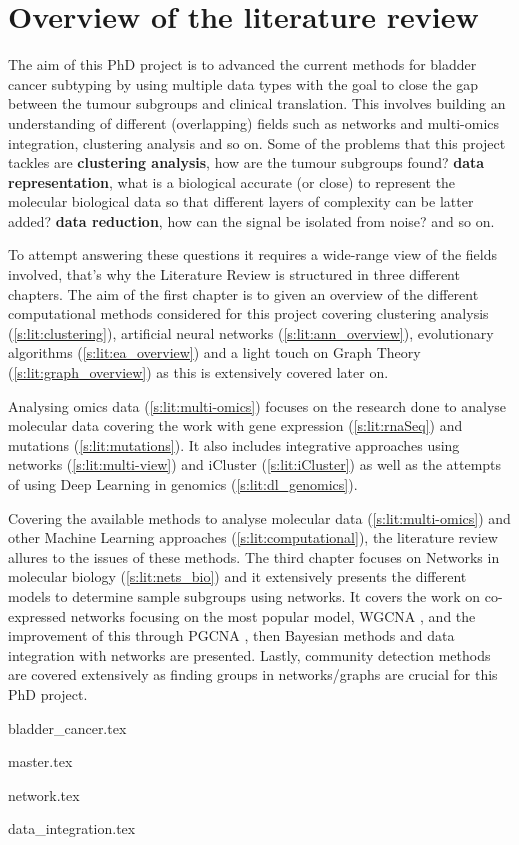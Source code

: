 

\section{Overview of the literature review}


The aim of this PhD project is to advanced the current methods for bladder cancer subtyping by using multiple data types with the goal to close the gap between the tumour subgroups and clinical translation. This involves building an understanding of different (overlapping) fields such as networks and multi-omics integration, clustering analysis and so on. Some of the problems that this project tackles are \textbf{clustering analysis}, how are the tumour subgroups found? \textbf{data representation}, what is a biological accurate (or close) to represent the molecular biological data so that different layers of complexity can be latter added? \textbf{data reduction}, how can the signal be isolated from noise? and so on.

To attempt answering these questions it requires a wide-range view of the fields involved, that's why the Literature Review is structured in three different chapters. The aim of the first chapter is to given an overview of the different computational methods considered for this project covering clustering analysis (\ref{s:lit:clustering}), artificial neural networks (\ref{s:lit:ann_overview}), evolutionary algorithms (\ref{s:lit:ea_overview}) and a light touch on Graph Theory (\ref{s:lit:graph_overview}) as this is extensively covered later on.

Analysing omics data (\ref{s:lit:multi-omics}) focuses on the research done to analyse molecular data covering the work with gene expression (\ref{s:lit:rnaSeq}) and mutations (\ref{s:lit:mutations}). It also includes integrative approaches using networks (\ref{s:lit:multi-view}) and iCluster (\ref{s:lit:iCluster}) as well as the attempts of using Deep Learning in genomics (\ref{s:lit:dl_genomics}). 

Covering the available methods to analyse molecular data (\ref{s:lit:multi-omics}) and other Machine Learning approaches (\ref{s:lit:computational}), the literature review allures to the issues of these methods. The third chapter focuses on Networks in molecular biology (\ref{s:lit:nets_bio}) and it extensively presents the different models to determine sample subgroups using networks. It covers the work on co-expressed networks focusing on the most popular model, WGCNA \cite{Langfelder2008-sn}, and the improvement of this through PGCNA \cite{Care2019-ij}, then Bayesian methods and data integration with networks are presented. Lastly, community detection methods are covered extensively as finding groups in networks/graphs are crucial for this PhD project.

{bladder_cancer.tex}

\pagebreak

{master.tex}

{network.tex}

{data_integration.tex}


